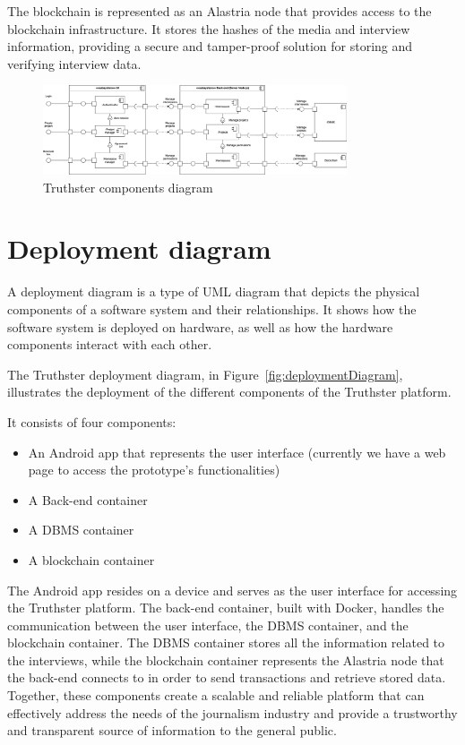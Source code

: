 \documentclass[target=mst,aauheader=]{thud}
\begin{document}
The blockchain is represented as an Alastria node that provides access to the blockchain infrastructure. It stores the hashes of the media and interview information, providing a secure and tamper-proof solution for storing and verifying interview data.

\begin{figure}
    \centering
    \includegraphics[width=0.8\textwidth]{images/componentDiagram.png}
    \caption{Truthster components diagram}
    \label{fig:componentDiagram}
\end{figure}

\section{Deployment diagram}

A deployment diagram is a type of UML diagram that depicts the physical components of a software system and their relationships. It shows how the software system is deployed on hardware, as well as how the hardware components interact with each other.

The Truthster deployment diagram, in Figure~\ref{fig:deploymentDiagram}, illustrates the deployment of the different components of the Truthster platform.

It consists of four components: 

    \begin{itemize}

        \item An Android app that represents the user interface (currently we have a web page to access the prototype's functionalities)
        \item A Back-end container
        \item A DBMS container
        \item A blockchain container

    \end{itemize} 

The Android app resides on a device and serves as the user interface for accessing the Truthster platform. The back-end container, built with Docker, handles the communication between the user interface, the DBMS container, and the blockchain container. The DBMS container stores all the information related to the interviews, while the blockchain container represents the Alastria node that the back-end connects to in order to send transactions and retrieve stored data. Together, these components create a scalable and reliable platform that can effectively address the needs of the journalism industry and provide a trustworthy and transparent source of information to the general public.
\end{document}
